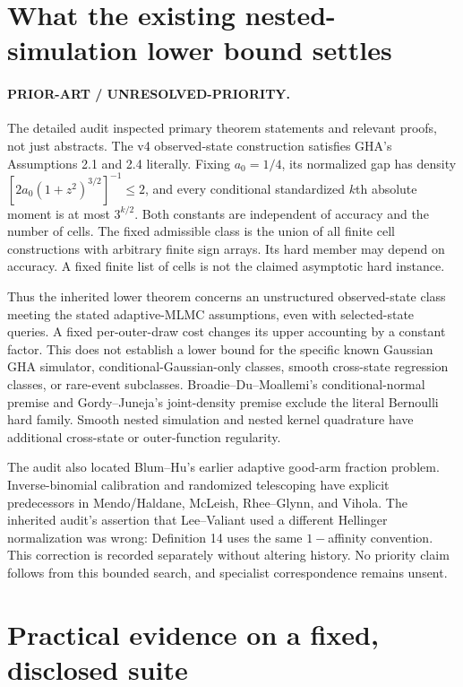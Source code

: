 \documentclass[11pt]{article}
\begin{document}




\section{What the existing nested-simulation lower bound settles}
\paragraph{PRIOR-ART / UNRESOLVED-PRIORITY.}
The detailed audit inspected primary theorem statements and relevant proofs,
not just abstracts. The v4 observed-state construction satisfies GHA's
Assumptions 2.1 and 2.4 literally. Fixing $a_0=1/4$, its normalized gap has
density
$[2a_0(1+z^2)^{3/2}]^{-1}\le2$, and every conditional standardized
$k$th absolute moment is at most $3^{k/2}$. Both constants are independent of
accuracy and the number of cells. The fixed admissible class is the union of
all finite cell constructions with arbitrary finite sign arrays. Its hard
member may depend on accuracy. A fixed finite list of cells is not the claimed
asymptotic hard instance.

Thus the inherited lower theorem concerns an unstructured observed-state
class meeting the stated adaptive-MLMC assumptions, even with selected-state
queries. A fixed per-outer-draw cost changes its upper accounting by a constant
factor. This does not establish a lower bound for the specific known Gaussian
GHA simulator, conditional-Gaussian-only classes, smooth cross-state
regression classes, or rare-event subclasses. Broadie--Du--Moallemi's
conditional-normal premise and Gordy--Juneja's joint-density premise exclude
the literal Bernoulli hard family. Smooth nested simulation and nested kernel
quadrature have additional cross-state or outer-function regularity.

The audit also located Blum--Hu's earlier adaptive good-arm fraction problem.
Inverse-binomial calibration and randomized telescoping have explicit
predecessors in Mendo/Haldane, McLeish, Rhee--Glynn, and Vihola. The inherited
audit's assertion that Lee--Valiant used a different Hellinger normalization
was wrong: Definition 14 uses the same $1-$affinity convention. This correction
is recorded separately without altering history. No priority claim follows
from this bounded search, and specialist correspondence remains unsent.

\section{Practical evidence on a fixed, disclosed suite}
\end{document}
